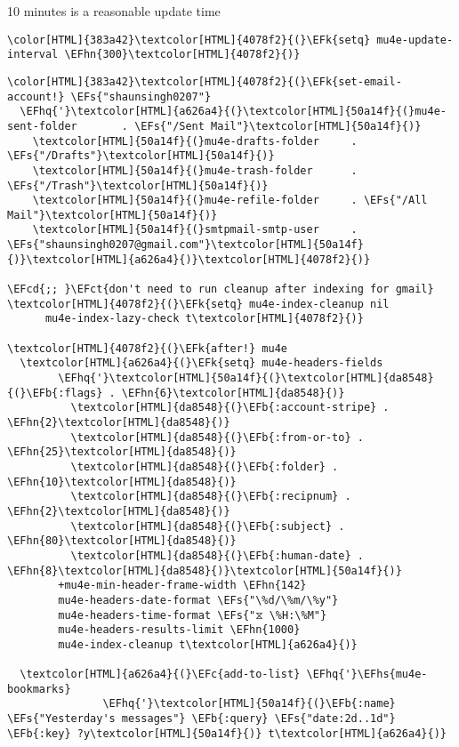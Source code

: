 \documentclass{scrartcl}
\newcommand{\EFk}[1]{\textcolor{EFk}{#1}} %
\newcommand{\EFs}[1]{\textcolor{EFs}{#1}} %
\newcommand{\EFb}[1]{\textcolor{EFb}{#1}} %
\newcommand{\EFct}[1]{\textcolor{EFct}{#1}} %
\newcommand{\EFc}[1]{\textcolor{EFc}{#1}} %
\newcommand{\EFcd}[1]{\textcolor{EFcd}{#1}} %
\newcommand{\EFhn}[1]{\textcolor{EFhn}{\textbf{#1}}} %
\newcommand{\EFhq}[1]{\textcolor{EFhq}{#1}} %
\newcommand{\EFhs}[1]{\textcolor{EFhs}{#1}} %
\begin{document}
10 minutes is a reasonable update time
\begin{Code}
\begin{Verbatim}[]
\color[HTML]{383a42}\textcolor[HTML]{4078f2}{(}\EFk{setq} mu4e-update-interval \EFhn{300}\textcolor[HTML]{4078f2}{)}
\end{Verbatim}
\end{Code}

\begin{Code}
\begin{Verbatim}[]
\color[HTML]{383a42}\textcolor[HTML]{4078f2}{(}\EFk{set-email-account!} \EFs{"shaunsingh0207"}
  \EFhq{'}\textcolor[HTML]{a626a4}{(}\textcolor[HTML]{50a14f}{(}mu4e-sent-folder       . \EFs{"/Sent Mail"}\textcolor[HTML]{50a14f}{)}
    \textcolor[HTML]{50a14f}{(}mu4e-drafts-folder     . \EFs{"/Drafts"}\textcolor[HTML]{50a14f}{)}
    \textcolor[HTML]{50a14f}{(}mu4e-trash-folder      . \EFs{"/Trash"}\textcolor[HTML]{50a14f}{)}
    \textcolor[HTML]{50a14f}{(}mu4e-refile-folder     . \EFs{"/All Mail"}\textcolor[HTML]{50a14f}{)}
    \textcolor[HTML]{50a14f}{(}smtpmail-smtp-user     . \EFs{"shaunsingh0207@gmail.com"}\textcolor[HTML]{50a14f}{)}\textcolor[HTML]{a626a4}{)}\textcolor[HTML]{4078f2}{)}

\EFcd{;; }\EFct{don't need to run cleanup after indexing for gmail}
\textcolor[HTML]{4078f2}{(}\EFk{setq} mu4e-index-cleanup nil
      mu4e-index-lazy-check t\textcolor[HTML]{4078f2}{)}

\textcolor[HTML]{4078f2}{(}\EFk{after!} mu4e
  \textcolor[HTML]{a626a4}{(}\EFk{setq} mu4e-headers-fields
        \EFhq{'}\textcolor[HTML]{50a14f}{(}\textcolor[HTML]{da8548}{(}\EFb{:flags} . \EFhn{6}\textcolor[HTML]{da8548}{)}
          \textcolor[HTML]{da8548}{(}\EFb{:account-stripe} . \EFhn{2}\textcolor[HTML]{da8548}{)}
          \textcolor[HTML]{da8548}{(}\EFb{:from-or-to} . \EFhn{25}\textcolor[HTML]{da8548}{)}
          \textcolor[HTML]{da8548}{(}\EFb{:folder} . \EFhn{10}\textcolor[HTML]{da8548}{)}
          \textcolor[HTML]{da8548}{(}\EFb{:recipnum} . \EFhn{2}\textcolor[HTML]{da8548}{)}
          \textcolor[HTML]{da8548}{(}\EFb{:subject} . \EFhn{80}\textcolor[HTML]{da8548}{)}
          \textcolor[HTML]{da8548}{(}\EFb{:human-date} . \EFhn{8}\textcolor[HTML]{da8548}{)}\textcolor[HTML]{50a14f}{)}
        +mu4e-min-header-frame-width \EFhn{142}
        mu4e-headers-date-format \EFs{"\%d/\%m/\%y"}
        mu4e-headers-time-format \EFs{"⧖ \%H:\%M"}
        mu4e-headers-results-limit \EFhn{1000}
        mu4e-index-cleanup t\textcolor[HTML]{a626a4}{)}

  \textcolor[HTML]{a626a4}{(}\EFc{add-to-list} \EFhq{'}\EFhs{mu4e-bookmarks}
               \EFhq{'}\textcolor[HTML]{50a14f}{(}\EFb{:name} \EFs{"Yesterday's messages"} \EFb{:query} \EFs{"date:2d..1d"} \EFb{:key} ?y\textcolor[HTML]{50a14f}{)} t\textcolor[HTML]{a626a4}{)}


\end{Verbatim}
\end{Code}
\end{document}
